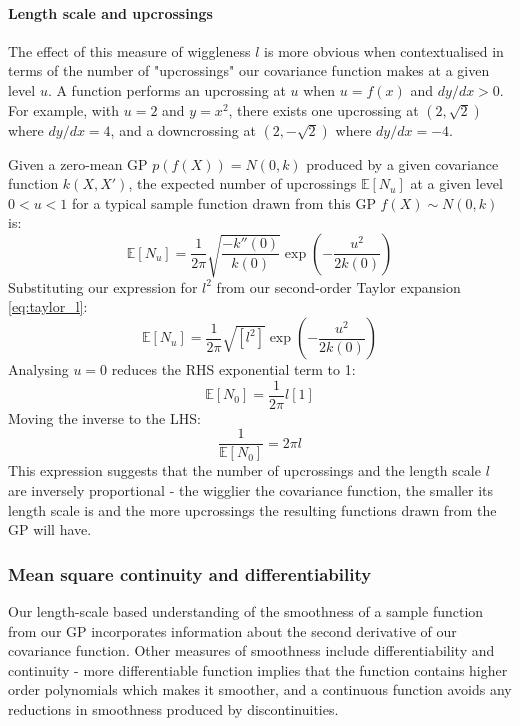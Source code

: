 \paragraph{Length scale and upcrossings}
The effect of this measure of wiggleness $l$ is more obvious when contextualised in terms of the number of "upcrossings" our covariance function makes at a given level $u$. A function performs an upcrossing at $u$ when $u = f(x)$ and $dy/dx > 0$. For example, with $u = 2$ and $y = x^2$, there exists one upcrossing at $(2, \sqrt{2})$ where $dy/dx = 4$, and a downcrossing at $(2, -\sqrt{2})$ where $dy/dx = -4$. 

Given a zero-mean GP $p(f(X)) = N(0, k)$ produced by a given covariance function $k(X, X')$, the expected number of upcrossings $\mathbb{E}[N_u]$ at a given level $ 0 < u < 1$ for a typical sample function drawn from this GP $f(X) \sim N(0, k)$ is: \cite{gp-ml}
\begin{equation} \label{eq:upcrossings}
    \mathbb{E}[N_u] = \frac{1}{2\pi} \sqrt{\frac{-k''(0)}{k(0)}} \exp \left(-\frac{u^2}{2k(0)}\right)
\end{equation}
Substituting our expression for $l^2$ from our second-order Taylor expansion \ref{eq:taylor_l}:
\begin{equation*}
    \mathbb{E}[N_u] = \frac{1}{2\pi} \sqrt{[l^2]} \exp \left(-\frac{u^2}{2k(0)}\right)
\end{equation*}
Analysing $u = 0$ reduces the RHS exponential term to 1:
\begin{equation*}
    \mathbb{E}[N_0] = \frac{1}{2\pi} l [1]
\end{equation*}
Moving the inverse to the LHS:
\begin{equation*}
    \frac{1}{\mathbb{E}[N_0]} = 2\pi l
\end{equation*}
This expression suggests that the number of upcrossings and the length scale $l$ are inversely proportional - the wigglier the covariance function, the smaller its length scale is and the more upcrossings the resulting functions drawn from the GP will have.

\subsubsection{Mean square continuity and differentiability}
Our length-scale based understanding of the smoothness of a sample function from our GP incorporates information about the second derivative of our covariance function. Other measures of smoothness include differentiability and continuity - more differentiable function implies that the function contains higher order polynomials which makes it smoother, and a continuous function avoids any reductions in smoothness produced by discontinuities.

